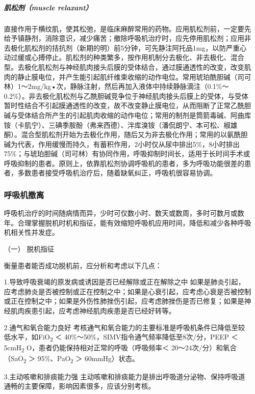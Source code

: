 \subparagraph{肌松剂（muscle relaxant）}

直接作用于横纹肌，使其松弛，是临床麻醉常用的药物。应用肌松剂前，一定要先给予镇静剂，消除意识，减少痛苦；撤除呼吸机治疗时，应先停用肌松剂；应用非去极化肌松剂的拮抗剂（新期的明）前5分钟，可先静注阿托品1mg，以防严重心动过缓或心搏停止。肌松剂的种类繁多，按作用机制分去极化、非去极化、混合型。去极化肌松剂与神经肌肉接头后膜的受体结合，通过膜通透性的改变，改变肌肉的静止膜电位，并产生能引起肌纤维束收缩的动作电位。常用琥珀酰胆碱（司可林）1～2mg/kg•次，静脉注射，然后再加入液体中持续静脉滴注（0.1\%～0.2\%）。非去极化肌松剂与乙酰胆碱竞争位于神经肌肉接头后膜上的受体，与受体暂时性结合不引起膜通透性的改变，故不改变静止膜电位，从而阻断了正常乙酰胆碱与受体结合所产生的引起肌肉收缩的动作电位；常用的制剂是筒箭毒碱、阿曲库铵（卡肌宁）、三碘季胺酚（弗来西德）、泮库溴铵（潘侃朗宁、本可松、椒雄酮）。混合型肌松剂开始为去极化作用，随后又为非去极化作用；常用的以氨酰胆碱为代表，作用缓慢而持久，有蓄积作用，2小时仅从尿中排出5\%，8小时排出75\%；与琥珀胆碱（司可林）有协同作用，呼吸抑制时间长，适用于长时间手术或呼吸抑制的患者。原则上，依靠肌松剂协调呼吸机的患者，多为呼吸功能很差的患者，多数患者接受呼吸机治疗后，随着缺氧纠正，呼吸机很容易协调。

\subsubsection{呼吸机撤离}

呼吸机治疗的时间随病情而异，少时可仅数小时、数天或数周，多时可数月或数年。合理掌握脱机时机和指征，能有效缩短呼吸机应用时间，降低和减少各种呼吸机相关性并发症。

\hypertarget{text00371.htmlux5cux23CHP16-3-5-3-1}{}
（一） 脱机指征

衡量患者能否成功脱机前，应分析和考虑以下几点：

1.导致呼吸衰竭的原发病或诱因是否已经解除或正在解除之中
如果是肺炎引起，应考虑肺炎是否被控制或正在控制之中；如果是心衰引起，应考虑心衰是否被控制或正在控制之中；如果是外伤性肺挫伤引起，应考虑肺挫伤是否已修复；如果是神经肌肉疾患引起，应考虑神经肌肉疾患是否已经好转等。

2.通气和氧合能力良好
考核通气和氧合能力的主要标准是呼吸机条件已降低至较低水平，如FiO\textsubscript{2}
＜ 40\%～50\%，SIMV指令通气频率降低至8次/分，PEEP ＜
5cmH\textsubscript{2} O，患者仍能保持相对正常的呼吸（呼吸频率＜
20～24次/分）和氧合（SaO\textsubscript{2} ＞ 95\%、PaO\textsubscript{2}
＞ 60mmHg）状态。

3.主动咳嗽和排痰能力强
主动咳嗽和排痰能力是排出呼吸道分泌物、保持呼吸道通畅的主要保障，影响因素很多，应该分别考核。


